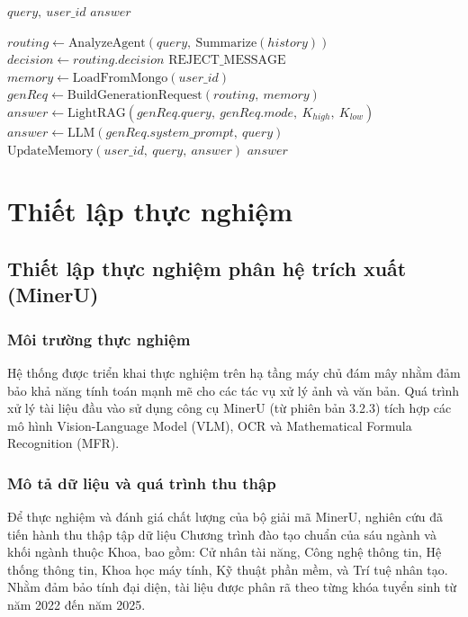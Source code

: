 \begin{algorithm}[H]
	\caption{Quy trình điều phối Agent}\label{alg:orchestration}
	\begin{algorithmic}[1]
		\Require $query,\ user\_id$ 
		\Ensure $answer$ 

		\State $routing \gets \text{AnalyzeAgent}(query,\ \text{Summarize}(history))$
		\State $decision \gets routing.decision$ 
			\State \Return $\text{REJECT\_MESSAGE}$
		\EndIf
		\State $memory \gets \text{LoadFromMongo}(user\_id)$ 
		\State $genReq \gets \text{BuildGenerationRequest}(routing,\ memory)$
			\State $answer \gets \text{LightRAG}(genReq.query,\ genReq.mode,\ K_{high},\ K_{low})$
		\Else
			\State $answer \gets \text{LLM}(genReq.system\_prompt,\ query)$
		\EndIf
			\State $\text{UpdateMemory}(user\_id,\ query,\ answer)$ 
		\EndIf
		\State \Return $answer$
	\end{algorithmic}
\end{algorithm}

\section{Thiết lập thực nghiệm}

\subsection{Thiết lập thực nghiệm phân hệ trích xuất (MinerU)}

\subsubsection{Môi trường thực nghiệm}
Hệ thống được triển khai thực nghiệm trên hạ tầng máy chủ đám mây nhằm đảm bảo khả năng tính toán mạnh mẽ cho các tác vụ xử lý ảnh và văn bản. Quá trình xử lý tài liệu đầu vào sử dụng công cụ MinerU (từ phiên bản 3.2.3) tích hợp các mô hình Vision-Language Model (VLM), OCR và Mathematical Formula Recognition (MFR). 

\subsubsection{Mô tả dữ liệu và quá trình thu thập}
Để thực nghiệm và đánh giá chất lượng của bộ giải mã MinerU, nghiên cứu đã tiến hành thu thập tập dữ liệu Chương trình đào tạo chuẩn của sáu ngành và khối ngành thuộc Khoa, bao gồm: Cử nhân tài năng, Công nghệ thông tin, Hệ thống thông tin, Khoa học máy tính, Kỹ thuật phần mềm, và Trí tuệ nhân tạo. Nhằm đảm bảo tính đại diện, tài liệu được phân rã theo từng khóa tuyển sinh từ năm 2022 đến năm 2025. 

